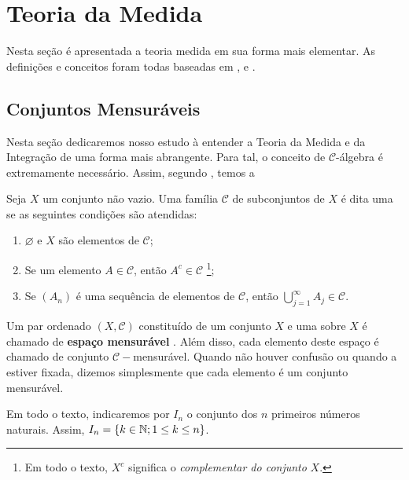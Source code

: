 \chapter{Teoria da Medida}

Nesta seção é apresentada a teoria medida em sua forma mais elementar.
As definições e conceitos foram todas baseadas em \cite{elon}, \cite{bartle} e \cite{magalhaes}.

\section{Conjuntos Mensuráveis}
Nesta seção dedicaremos nosso estudo à entender a Teoria da Medida e da Integração de uma forma mais abrangente.
Para tal, o conceito de $\mathcal{C}$-álgebra é extremamente necessário. Assim, segundo \cite{bartle}, temos a

\begin{definition}
\label{def:sigma-algebra}

    Seja $X$ um conjunto não vazio. Uma família $\mathcal{C}$ de subconjuntos de $X$ é dita uma \sigal se as seguintes condições são atendidas:
    \begin{enumerate}[label*= (\roman*)]
        \item $\varnothing$ e $X$ são elementos de $\mathcal{C}$;     
        \item Se um elemento $A \in \mathcal{C}$, então $A^c \in \mathcal{C}$
        \footnote{Em todo o texto, $X^c$ significa o \textit{complementar do conjunto} $X$.};
        \item Se $(A_n)$ é uma sequência de elementos de $\mathcal{C}$, 
        então $\displaystyle \bigcup_{j = 1}^\infty A_j \in \mathcal{C}$.
    \end{enumerate}

\end{definition}

Um par ordenado $(X, \mathcal{C})$  constituído de um conjunto $X$ e uma \sigal sobre $X$ é chamado de  \textbf{espaço mensurável} . 
Além disso, cada elemento deste espaço é chamado de conjunto $\mathcal{C}-$mensurável.
Quando não houver confusão ou quando a \sigal estiver fixada, dizemos simplesmente que cada elemento é um conjunto mensurável.

\begin{remark}
	Em todo o texto, indicaremos por $I_n$ o conjunto dos $n$ primeiros números naturais. 
	Assim, $I_n = \{k \in \operatorname{\mathbb{N}}; 1 \leq k \leq n\}$.
\end{remark}

